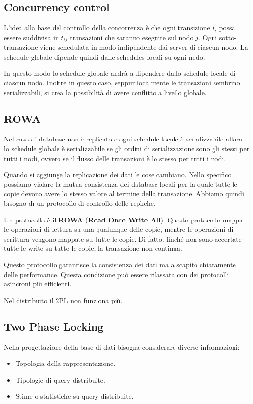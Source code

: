 \subsection{Concurrency control}
L'idea alla base del controllo della concorrenza è che ogni transizione $t_i$
possa essere suddivisa in $t_{ij}$ transazioni che saranno eseguite sul nodo $j$.
Ogni sotto-transazione viene schedulata in modo indipendente dai server di
ciascun nodo. La schedule globale dipende quindi dalle schedules locali su ogni nodo.

In questo modo lo schedule globale andrà a dipendere dallo schedule locale di
ciascun nodo. Inoltre in questo caso, seppur localmente le transazioni sembrino
serializzabili, si crea la possibilità di avere conflitto a livello globale.
\subsection{ROWA}
Nel caso di database non è replicato e ogni schedule locale è serializzabile
allora lo schedule globale è serializzabile se gli ordini di serializzazione
sono gli stessi per tutti i nodi, ovvero se il flusso delle transazioni è lo
stesso per tutti i nodi.

Quando si aggiunge la replicazione dei dati le cose cambiano. Nello specifico
possiamo violare la mutua consistenza dei database locali per la quale tutte le
copie devono avere lo stesso valore al termine della transazione. Abbiamo quindi
bisogno di un protocollo di controllo delle repliche.

Un protocollo è il \textbf{ROWA} (\textbf{Read Once Write All}). Questo
protocollo mappa le operazioni di lettura su una qualunque delle copie, mentre
le operazioni di scrittura vengono mappate su tutte le copie. Di fatto, finché
non sono accertate tutte le write su tutte le copie, la transazione non continua.

Questo protocollo garantisce la consistenza dei dati ma a scapito chiaramente delle
performance. Questa condizione può essere rilassata con dei protocolli asincroni
più efficienti.

Nel distribuito il 2PL  non funziona più.

\subsection{Two Phase Locking}
Nella progettazione della base di dati bisogna considerare diverse informazioni:
\begin{itemize}
    \item Topologia della rappresentazione.
    \item Tipologie di query distribuite.
    \item Stime o statistiche su query distribuite.
\end{itemize}

